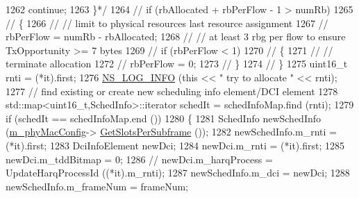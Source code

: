 \begin{DoxyCode}
1262 \textcolor{comment}{                                                continue;}
1263 \textcolor{comment}{                                        \}*/}
1264                 \textcolor{comment}{//                              if (rbAllocated + rbPerFlow - 1 > numRb)}
1265                 \textcolor{comment}{//                              \{}
1266                 \textcolor{comment}{//                                      // limit to physical resources last resource
       assignment}
1267                 \textcolor{comment}{//                                      rbPerFlow = numRb - rbAllocated;}
1268                 \textcolor{comment}{//                                      // at least 3 rbg per flow to ensure TxOpportunity
       >= 7 bytes}
1269                 \textcolor{comment}{//                                      if (rbPerFlow < 1)}
1270                 \textcolor{comment}{//                                      \{}
1271                 \textcolor{comment}{//                                              // terminate allocation}
1272                 \textcolor{comment}{//                                              rbPerFlow = 0;}
1273                 \textcolor{comment}{//                                      \}}
1274                 \textcolor{comment}{//                              \}}
1275                 uint16\_t rnti = (*it).first;
1276                 \hyperlink{group__logging_gafbd73ee2cf9f26b319f49086d8e860fb}{NS\_LOG\_INFO} (\textcolor{keyword}{this} << \textcolor{stringliteral}{" try to allocate "} << rnti);
1277                 \textcolor{comment}{// find existing or create new scheduling info element/DCI element}
1278                 std::map<uint16\_t,SchedInfo>::iterator schedIt = schedInfoMap.find (rnti);
1279                 \textcolor{keywordflow}{if} (schedIt == schedInfoMap.end ())
1280                 \{
1281                         SchedInfo newSchedInfo (\hyperlink{classns3_1_1MmWaveMacScheduler_a24d7af4971d2e500fe543cefbafa2fd9}{m\_phyMacConfig}->
      \hyperlink{classns3_1_1MmWavePhyMacCommon_a7b6552d2e0ffbeaf3bc2f9db6d0d6e63}{GetSlotsPerSubframe} ());
1282                         newSchedInfo.m\_rnti = (*it).first;
1283                         DciInfoElement newDci;
1284                         newDci.m\_rnti = (*it).first;
1285                         newDci.m\_tddBitmap = 0;
1286                         \textcolor{comment}{//                              newDci.m\_harqProcess = UpdateHarqProcessId
       ((*it).m\_rnti);}
1287                         newSchedInfo.m\_dci = newDci;
1288                         newSchedInfo.m\_frameNum = frameNum;

\end{DoxyCode}
